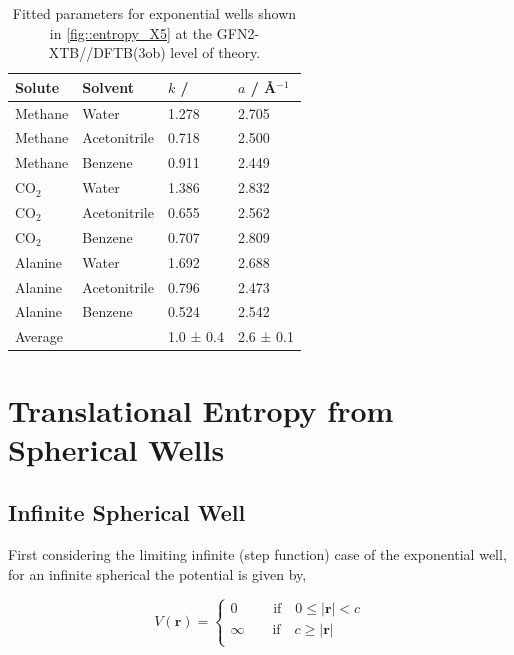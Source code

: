 \documentclass[../main.tex]{subfiles}
\begin{document}
\begin{table}[h!]
	\renewcommand{\arraystretch}{1.5}
	\begin{center}
		\small
		\begin{tabularx}{\textwidth}{YYYY} 
			\toprule
			Solute & Solvent& $k$ / \kcal & $a$ / \AA$^{-1}$ \\
			\hline
			Methane  & Water &   1.278    &   2.705     \\
			Methane  & Acetonitrile &   0.718    &   2.500    \\
			Methane  & Benzene &   0.911    &    2.449    \\
			CO$_2$  & Water&   1.386    &    2.832     \\
			CO$_2$  & Acetonitrile&   0.655    &    2.562   \\
			CO$_2$  & Benzene &    0.707   &    2.809   \\
			Alanine   &Water &     1.692  &    2.688     \\
			Alanine   & Acetonitrile&   0.796    &    2.473   \\
			Alanine   & Benzene &   0.524   &   2.542    \\
			\hline
			Average && 1.0 ± 0.4 & 2.6 ± 0.1 \\
			\bottomrule
		\end{tabularx}
	\end{center}
	\caption{Fitted parameters for exponential wells shown in \figurename{ \ref{fig::entropy_X5}} at the GFN2-XTB//DFTB(3ob) level of theory.} 
	\label{table::figX5_params}
\end{table}


\clearpage 
\section{Translational Entropy from Spherical Wells}
\subsection{Infinite Spherical Well}

First considering the limiting infinite (step function) case of the exponential well, for an infinite spherical the potential is given by,

\begin{equation}
V(\boldsymbol{r}) = 
\begin{cases}
0 \qquad\;\; \text{if} \quad 0 \le |\boldsymbol{r}| < c \\
\infty \qquad \text{if} \quad  c \ge |\boldsymbol{r}| \\
\end{cases}
\end{equation}
\end{document}
